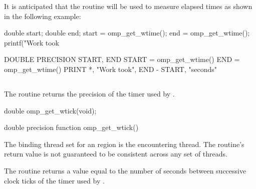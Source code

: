 \begin{note}
It is anticipated that the routine will be used to measure elapsed times as shown
in the following example:

\begin{ccppspecific}
\begin{ompcFunction}
double start;
double end;
start = omp_get_wtime();
end = omp_get_wtime();
printf("Work took %
\end{ompcFunction}
\end{ccppspecific}

\begin{fortranspecific}
\begin{ompcFunction}
DOUBLE PRECISION START, END
START = omp_get_wtime()
END = omp_get_wtime()
PRINT *, "Work took", END - START, "seconds"
\end{ompcFunction}
\end{fortranspecific}
\end{note}









\subsection{}
\label{subsec:omp_get_wtick}
\summary
The  routine returns the precision of the timer used by
.


\format
\begin{ccppspecific}
\begin{ompcFunction}
double omp_get_wtick(void);
\end{ompcFunction}
\end{ccppspecific}

\begin{fortranspecific}
\begin{ompfFunction}
double precision function omp_get_wtick()
\end{ompfFunction}
\end{fortranspecific}

\binding
The binding thread set for an  region is the encountering thread. The
routine's return value is not guaranteed to be consistent across any set of threads.

\effect
The  routine returns a value equal to the number of seconds between
successive clock ticks of the timer used by .

